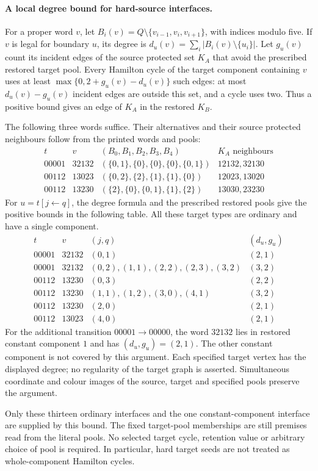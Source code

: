 \paragraph{A local degree bound for hard-source interfaces.}
For a proper word $v$, let
$B_i(v)=Q\setminus\{v_{i-1},v_i,v_{i+1}\}$, with indices modulo five.
If $v$ is legal for boundary $u$, its degree is
$d_u(v)=\sum_i|B_i(v)\setminus\{u_i\}|$.
Let $g_u(v)$ count its incident edges of the source protected set
$K_A$ that avoid the prescribed restored target pool.
Every Hamilton cycle of the target component containing $v$ uses at least
$\max\{0,2+g_u(v)-d_u(v)\}$ such edges: at most
$d_u(v)-g_u(v)$ incident edges are outside this set, and a cycle uses two.
Thus a positive bound gives an edge of $K_A$ in the restored $K_B$.

The following three words suffice. Their alternatives and their source
protected neighbours follow from the printed words and pools:
\[
\begin{array}{c|c|c|l}
t&v&(B_0,B_1,B_2,B_3,B_4)&K_A\text{ neighbours}\\\hline
00001&32132&(\{0,1\},\{0\},\{0\},\{0\},\{0,1\})&12132,32130\\
00112&13023&(\{0,2\},\{2\},\{1\},\{1\},\{0\})&12023,13020\\
00112&13230&(\{2\},\{0\},\{0,1\},\{1\},\{2\})&13030,23230
\end{array}
\]
For $u=t[j\leftarrow q]$, the degree formula and the prescribed
restored pools give the positive bounds in the following table.
All these target types are ordinary and have a single component.
\[
\begin{array}{c|c|l|c}
t&v&(j,q)&(d_u,g_u)\\\hline
00001&32132&(0,1)&(2,1)\\
00001&32132&(0,2),(1,1),(2,2),(2,3),(3,2)&(3,2)\\
00112&13230&(0,3)&(2,2)\\
00112&13230&(1,1),(1,2),(3,0),(4,1)&(3,2)\\
00112&13230&(2,0)&(2,1)\\
00112&13023&(4,0)&(2,1)
\end{array}
\]
For the additional transition $00001\to00000$, the word $32132$
lies in restored constant component $1$ and has $(d_u,g_u)=(2,1)$.
The other constant component is not covered by this argument.
Each specified target vertex has the displayed degree; no regularity
of the target graph is asserted. Simultaneous coordinate and colour
images of the source, target and specified pools preserve the argument.

Only these thirteen ordinary interfaces and the one constant-component
interface are supplied by this bound. The fixed target-pool memberships
are still premises read from the literal pools. No selected target cycle,
retention value or arbitrary choice of pool is required. In particular,
hard target seeds are not treated as whole-component Hamilton cycles.

